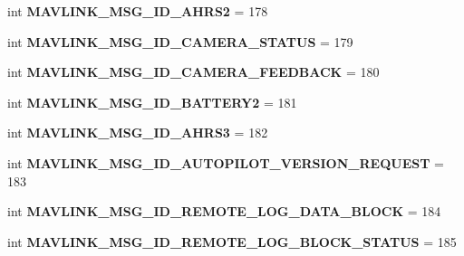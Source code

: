 \begin{DoxyCompactItemize}
\item 
\mbox{\label{namespacepymavlink_1_1dialects_1_1v10_ad6c2e2efb24a001c7a5861a2ad79f9e2}} 
int {\bfseries M\+A\+V\+L\+I\+N\+K\+\_\+\+M\+S\+G\+\_\+\+I\+D\+\_\+\+A\+H\+R\+S2} = 178
\item 
\mbox{\label{namespacepymavlink_1_1dialects_1_1v10_a97e7be38b320e67df87c4ccdffdf9264}} 
int {\bfseries M\+A\+V\+L\+I\+N\+K\+\_\+\+M\+S\+G\+\_\+\+I\+D\+\_\+\+C\+A\+M\+E\+R\+A\+\_\+\+S\+T\+A\+T\+US} = 179
\item 
\mbox{\label{namespacepymavlink_1_1dialects_1_1v10_ae6dd07adacb69739e4022a37ec637f10}} 
int {\bfseries M\+A\+V\+L\+I\+N\+K\+\_\+\+M\+S\+G\+\_\+\+I\+D\+\_\+\+C\+A\+M\+E\+R\+A\+\_\+\+F\+E\+E\+D\+B\+A\+CK} = 180
\item 
\mbox{\label{namespacepymavlink_1_1dialects_1_1v10_ab51d4e2ec13dfca8a3f76b62111bd960}} 
int {\bfseries M\+A\+V\+L\+I\+N\+K\+\_\+\+M\+S\+G\+\_\+\+I\+D\+\_\+\+B\+A\+T\+T\+E\+R\+Y2} = 181
\item 
\mbox{\label{namespacepymavlink_1_1dialects_1_1v10_aae5fd32b08095063480da0f9c8523452}} 
int {\bfseries M\+A\+V\+L\+I\+N\+K\+\_\+\+M\+S\+G\+\_\+\+I\+D\+\_\+\+A\+H\+R\+S3} = 182
\item 
\mbox{\label{namespacepymavlink_1_1dialects_1_1v10_a8b84a573fefdd52c9f940936e7390378}} 
int {\bfseries M\+A\+V\+L\+I\+N\+K\+\_\+\+M\+S\+G\+\_\+\+I\+D\+\_\+\+A\+U\+T\+O\+P\+I\+L\+O\+T\+\_\+\+V\+E\+R\+S\+I\+O\+N\+\_\+\+R\+E\+Q\+U\+E\+ST} = 183
\item 
\mbox{\label{namespacepymavlink_1_1dialects_1_1v10_ad1657ac2f863c3097d736275e4846cd6}} 
int {\bfseries M\+A\+V\+L\+I\+N\+K\+\_\+\+M\+S\+G\+\_\+\+I\+D\+\_\+\+R\+E\+M\+O\+T\+E\+\_\+\+L\+O\+G\+\_\+\+D\+A\+T\+A\+\_\+\+B\+L\+O\+CK} = 184
\item 
\mbox{\label{namespacepymavlink_1_1dialects_1_1v10_ace6c4bfb0896bda132d8b70a4f1a6e9d}} 
int {\bfseries M\+A\+V\+L\+I\+N\+K\+\_\+\+M\+S\+G\+\_\+\+I\+D\+\_\+\+R\+E\+M\+O\+T\+E\+\_\+\+L\+O\+G\+\_\+\+B\+L\+O\+C\+K\+\_\+\+S\+T\+A\+T\+US} = 185

\end{DoxyCompactItemize}
